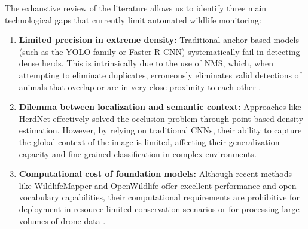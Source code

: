 The exhaustive review of the literature allows us to identify three main technological gaps that currently limit automated wildlife monitoring:

\begin{enumerate}
    \item \textbf{Limited precision in extreme density:} Traditional anchor-based models (such as the YOLO family or Faster R-CNN) systematically fail in detecting dense herds. This is intrinsically due to the use of NMS, which, when attempting to eliminate duplicates, erroneously eliminates valid detections of animals that overlap or are in very close proximity to each other \cite{xu-review}.

    \item \textbf{Dilemma between localization and semantic context:} Approaches like HerdNet \cite{herdnet} effectively solved the occlusion problem through point-based density estimation. However, by relying on traditional CNNs, their ability to capture the global context of the image is limited, affecting their generalization capacity and fine-grained classification in complex environments.

    \item \textbf{Computational cost of foundation models:} Although recent methods like WildlifeMapper and OpenWildlife offer excellent performance and open-vocabulary capabilities, their computational requirements are prohibitive for deployment in resource-limited conservation scenarios or for processing large volumes of drone data \cite{open-wildlife}.
\end{enumerate}

